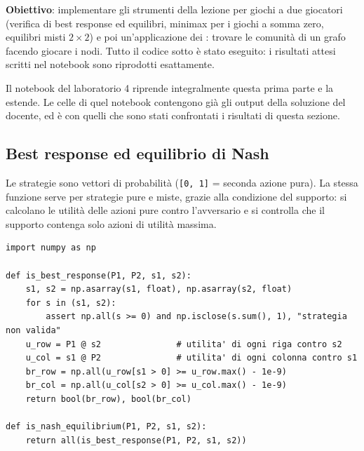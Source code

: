 
\textbf{Obiettivo}: implementare gli strumenti della lezione per giochi a due giocatori
(verifica di best response ed equilibri, minimax per i giochi a somma zero, equilibri misti
$2\times2$) e poi un'applicazione dei : trovare le comunità di un
grafo facendo giocare i nodi. Tutto il codice sotto è stato eseguito: i risultati attesi
scritti nel notebook sono riprodotti esattamente.

\begin{osservazione}
Il notebook del laboratorio 4 riprende integralmente questa prima parte e la estende. Le
celle di quel notebook contengono già gli output della soluzione del docente, ed è con
quelli che sono stati confrontati i risultati di questa sezione.
\end{osservazione}

\subsection{Best response ed equilibrio di Nash}

Le strategie sono vettori di probabilità (\texttt{[0, 1]} = seconda azione pura). La stessa
funzione serve per strategie pure e miste, grazie alla condizione del supporto: si calcolano
le utilità delle azioni pure contro l'avversario e si controlla che il supporto contenga solo
azioni di utilità massima.

\begin{lstlisting}
import numpy as np

def is_best_response(P1, P2, s1, s2):
    s1, s2 = np.asarray(s1, float), np.asarray(s2, float)
    for s in (s1, s2):
        assert np.all(s >= 0) and np.isclose(s.sum(), 1), "strategia non valida"
    u_row = P1 @ s2               # utilita' di ogni riga contro s2
    u_col = s1 @ P2               # utilita' di ogni colonna contro s1
    br_row = np.all(u_row[s1 > 0] >= u_row.max() - 1e-9)
    br_col = np.all(u_col[s2 > 0] >= u_col.max() - 1e-9)
    return bool(br_row), bool(br_col)

def is_nash_equilibrium(P1, P2, s1, s2):
    return all(is_best_response(P1, P2, s1, s2))
\end{lstlisting}


